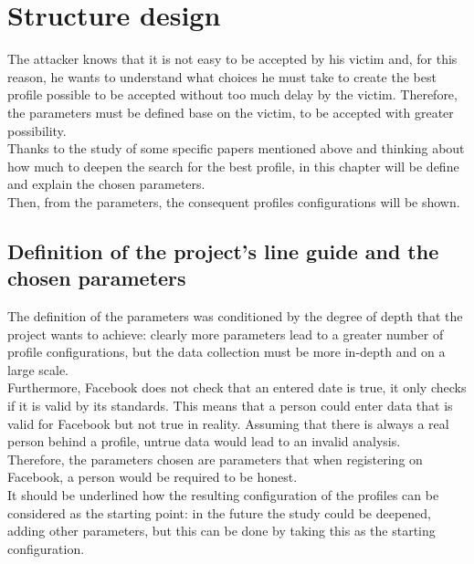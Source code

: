 
\chapter{Structure design}
\label{cap:structure-design}

The attacker knows that it is not easy to be accepted by his victim and, for this reason, he wants to understand what choices he must take to create the best profile possible to be accepted without too much delay by the victim. Therefore, the parameters must be defined base on the victim, to be accepted with greater possibility.
\\Thanks to the study of some specific papers mentioned above and thinking about how much to deepen the search for the best profile, in this chapter will be define and explain the chosen parameters.
\\Then, from the parameters, the consequent profiles configurations will be shown.

\section{Definition of the project's line guide and the chosen parameters}
The definition of the parameters was conditioned by the degree of depth that the project wants to achieve: clearly more parameters lead to a greater number of profile configurations, but the data collection must be more in-depth and on a large scale.\\
Furthermore, Facebook does not check that an entered date is true, it only checks if it is valid by its standards. This means that a person could enter data that is valid for Facebook but not true in reality. Assuming that there is always a real person behind a profile, untrue data would lead to an invalid analysis.\\
Therefore, the parameters chosen are parameters that when registering on Facebook, a person would be required to be honest.\\
It should be underlined how the resulting configuration of the profiles can be considered as the starting point: in the future the study could be deepened, adding other parameters, but this can be done by taking this as the starting configuration.

